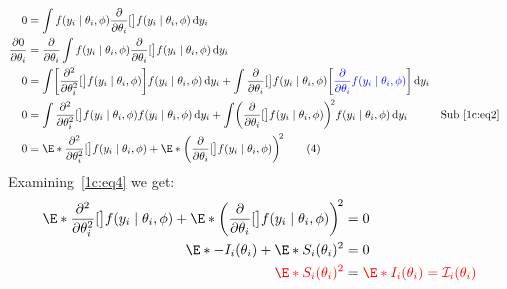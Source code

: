 \documentclass[oneside]{book}\usepackage[]{graphicx}\usepackage[svgnames]{xcolor}
\let\log\relax%
\begin{document}
\begin{align*}
      0                 & =\int f(y_i\mid \theta_i,\phi)\pdv*{\log[\big]{f(y_i\mid \theta_i,\phi)}}{\theta_i}\odif{y_i}                                                                                                                                                                                                          \\
      \pdv{0}{\theta_i} & =\pdv*{\int f(y_i\mid \theta_i,\phi)\pdv*{\log[\big]{f(y_i\mid \theta_i,\phi)}}{\theta_i}\odif{y_i}}{\theta_i}                                                                                                                                                                                         \\
      0                 & =\int \biggl[\pdv*[order=2]{\log[\big]{f(y_i\mid \theta_i,\phi)}}{\theta_i}\biggr]f(y_i\mid \theta_i,\phi)\odif{y_i}+\int \pdv*{\log[\big]{f(y_i\mid \theta_i,\phi)}}{\theta_i}\biggl[\textcolor{Blue}{\pdv*{f(y_i\mid \theta_i,\phi)}{\theta_i}}\biggr]\odif{y_i}                                     \\
      0                 & =\int \pdv*[order=2]{\log[\big]{f(y_i\mid \theta_i,\phi)}}{\theta_i}f(y_i\mid \theta_i,\phi)\odif{y_i}+\int \biggl(\pdv*{\log[\big]{f(y_i\mid \theta_i,\phi)}}{\theta_i}\biggr)^{\!2}f(y_i\mid \theta_i,\phi)\odif{y_i}                                                   &  & \text{Sub~\ref{1c:eq2}} \\
      0                 & =\E*{\pdv*[order=2]{\log[\big]{f(y_i\mid \theta_i,\phi)}}{\theta_i}}+\E*{\biggl(\pdv*{\log[\big]{f(y_i\mid \theta_i,\phi)}}{\theta_i}\biggr)^{\!2}}                                                                                              \label{1c:eq4}\tag*{(4)}
\end{align*}
Examining~\ref{1c:eq4} we get:
\begin{align*}
      \E*{\pdv*[order=2]{\log[\big]{f(y_i\mid \theta_i,\phi)}}{\theta_i}}+\E*{\biggl(\pdv*{\log[\big]{f(y_i\mid \theta_i,\phi)}}{\theta_i}\biggr)^{\!2}} & =0                                                           \\
      \E*{-I_i(\theta_i)}+\E*{S_i(\theta_i)^2}                                                                                                           & =0                                                           \\
      \textcolor{Red}{\E*{S_i(\theta_i)^2}}                                                                                                              & =\textcolor{Red}{\E*{I_i(\theta_i)}=\mathcal{I}_i(\theta_i)}
\end{align*}
\end{document}
